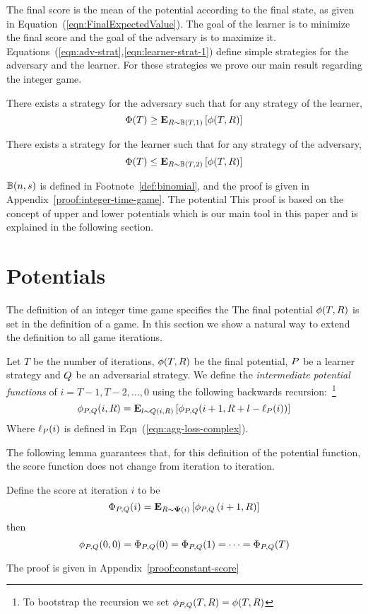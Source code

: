 \documentclass[12pt]{article} %
\begin{document}
The final score is the mean of the potential according to the final
state, as given in Equation~(\ref{eqn:FinalExpectedValue}).
The goal of the learner is to minimize the final score and the goal of
the adversary is to maximize it.
Equations~(\ref{eqn:adv-strat},\ref{eqn:learner-strat-1}) define
simple strategies for the adversary and the learner. For these
strategies we prove our main result regarding the integer game.
\begin{theorem} \label{thm:integer-time-game}
  
    There exists a strategy for the adversary such that for any strategy
    of the learner, $$\Phi(T) \geq {\bf E}_{R \sim \mathbb{B}(T,1)}\left[ \phi(T,R) \right]$$

    There exists a strategy for the learner such that for any strategy
    of the adversary, $$\Phi(T) \leq {\bf E}_{R \sim \mathbb{B}(T,2)}\left[ \phi(T,R) \right]$$
  \end{theorem}

  $\mathbb{B}(n,s)$ is defined in Footnote~\ref{def:binomial}, and the 
  proof is given in Appendix~\ref{proof:integer-time-game}. 
  The potential 
  This proof is based on the concept of upper and lower potentials
  which is our main tool in this paper and is explained in the
  following section. 

\section{Potentials}

The definition of an integer time game specifies the 
The final potential $\phi(T,R)$ is set in the definition of a game.
In this section we show a natural way to extend the definition to all game iterations.

\begin{definition} \label{def:back-recursion}
Let $T$ be the number of iterations, $\phi(T,R)$ be the final
potential, $P$ be a learner strategy and $Q$ be an
adversarial strategy. We define the {\em intermediate potential
  functions} of  $i=T-1,T-2,\ldots,0$ using the following
backwards recursion:~\footnote{To bootstrap the recursion we set
  $\phi_{P,Q}(T,R) = \phi(T,R)$}
\begin{equation}
  \phi_{P,Q}(i,R) = {\bf E}_{l \sim Q(i,R)}\left[ \phi_{P,Q}(i+1,R+l-\ell_P(i)) \right]
\end{equation}
Where $\ell_P(i)$ is defined in Eqn~(\ref{eqn:agg-loss-complex}).
\end{definition}
The following lemma guarantees that, for this definition of the
potential function, the score function does not change
from iteration to iteration.
\begin{lemma} \label{lemma:constant-score}
  Define the score at iteration $i$ to be 
  \begin{equation} \label{eqn:potential}
  \Phi_{P,Q}(i) = {\bf E}_{R \sim {\bf \Psi}(i)}\left[ \phi_{P,Q} \left(i+1,R \right) \right]
\end{equation}
then
$$\phi_{P,Q}(0,0) = \Phi_{P,Q}(0) = \Phi_{P,Q}(1) = \cdots = \Phi_{P,Q}(T)$$
\end{lemma}
The proof is given in Appendix~\ref{proof:constant-score}
\end{document}
